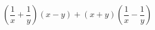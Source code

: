 \begin{ex}[type=calculate_expression]
	\begin{condition}
		\( \left( \dfrac{1}{x}+\dfrac{1}{y} \right)(x-y)+(x+y)\left( \dfrac{1}{x}-\dfrac{1}{y} \right) \)
	\end{condition}
\end{ex}